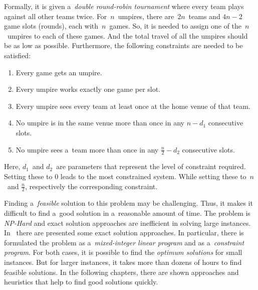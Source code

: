 \documentclass[a4paper, 10pt, twocolumn]{article}
\begin{document}
    Formally, it is given a~\emph{double round-robin tournament} where every
    team plays against all other teams twice. For~$ n $~umpires, there
    are~$ 2n $~teams and $ 4n - 2 $ game slots (rounds), each
    with~$ n $~games. So, it is needed to assign one of the~$ n $~umpires
    to each of these games. And the total travel of all the umpires should
    be as low as possible. Furthermore, the following constraints are
    needed to be satisfied:
    \begin{enumerate}
        \item
            Every game gets an umpire.

        \item
            Every umpire works exactly one game per slot.

        \item
            Every umpire sees every team at least once at the home
            venue of that team.

        \item
            No umpire is in the same venue more than once in any
            $ n - d_1 $ consecutive slots.

        \item
            No umpire sees a~team more than once in any $ \frac{n}{2}
            - d_2 $ consecutive slots.
    \end{enumerate}
    Here, $ d_1 $~and $ d_2 $~are parameters that represent the level of
    constraint required. Setting these to 0 leads to the most constrained
    system. While setting these to~$ n $~and $ \frac{n}{2} $, respectively
     the corresponding constraint.

    Finding a~\emph{feasible} solution to this problem may be
    challenging. Thus, it makes it difficult to find a~good solution in
    a~reasonable amount of time. The problem is \emph{NP-Hard} and
    exact solution approaches are inefficient in solving large instances.
    In~\cite{bendersCutsPaper, bendersCutsCollection} there are presented
    some exact solution approaches. In particular, there is formulated
    the problem as a~\emph{mixed-integer linear program} and as
    a~\emph{constraint program}. For both cases, it is possible to find
    the \emph{optimum solutions} for small instances. But for larger
    instances, it takes more than dozens of hours to find feasible
    solutions. In the following chapters, there are shown approaches and
    heuristics that help to find good solutions quickly.
\end{document}
